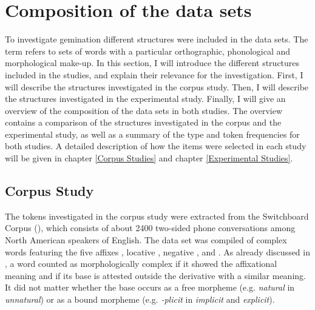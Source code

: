 \section{Composition of the data sets} \label{General Method Data Sets}

To investigate gemination different structures were included in the data sets. The term  refers to sets of words with a particular orthographic, phonological and morphological make-up. In this section, I will introduce the different structures included in the studies, and explain their relevance for the investigation.
 First, I will describe the structures investigated in the corpus study. Then, I will describe the structures investigated in the experimental study. Finally, I will give an overview of the composition of the data sets in both studies. The overview contains a comparison of the structures investigated in the corpus and the experimental study, as well as a summary of the type and token frequencies for both studies. A detailed description of how the items were selected in each study will be given in chapter \ref{Corpus Studies} and chapter \ref{Experimental Studies}.


\subsection{Corpus Study}\label{corpus data composition}

The tokens investigated in the corpus study were extracted from the Switchboard Corpus (\citealt{Godfrey.1997}), which consists of about 2400 two-sided phone conversations among North American speakers of English.  The data set was compiled of complex words featuring the five affixes , locative , negative ,  and . As already discussed in ,  a word counted as morphologically complex if it showed the affixational meaning and if its base is attested outside the derivative with a similar meaning. It did not matter whether the base occurs as a free morpheme (e.g. \textit{natural} in \textit{unnatural}) or as a bound morpheme (e.g. \textit{-plicit} in \textit{implicit}  and  \textit{explicit}). 


